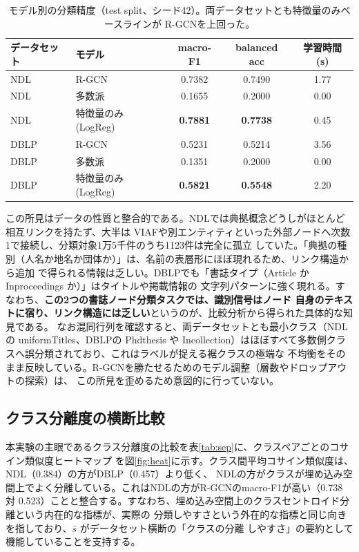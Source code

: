 \documentclass[dvipdfmx,twoside,11pt]{article}
\begin{document}
\begin{table}[t]
\centering
\caption{モデル別の分類精度（test split、シード42）。両データセットとも特徴量のみベースラインが
R-GCNを上回った。}
\label{tab:acc}
\begin{tabular}{llccc}
\toprule
データセット & モデル & macro-F1 & balanced acc & 学習時間 (s) \\
\midrule
NDL  & R-GCN                    & 0.7382 & 0.7490 & 1.77 \\
NDL  & 多数派                   & 0.1655 & 0.2000 & 0.00 \\
NDL  & 特徴量のみ (LogReg)      & \textbf{0.7881} & \textbf{0.7738} & 0.45 \\
\midrule
DBLP & R-GCN                    & 0.5231 & 0.5214 & 3.56 \\
DBLP & 多数派                   & 0.1351 & 0.2000 & 0.00 \\
DBLP & 特徴量のみ (LogReg)      & \textbf{0.5821} & \textbf{0.5548} & 2.20 \\
\bottomrule
\end{tabular}
\end{table}

この所見はデータの性質と整合的である。NDLでは典拠概念どうしがほとんど相互リンクを持たず、大半は
VIAFや別エンティティといった外部ノードへ次数1で接続し、分類対象1万5千件のうち1123件は完全に孤立
していた。「典拠の種別（人名か地名か団体か）」は、名前の表層形にほぼ現れるため、リンク構造から追加
で得られる情報は乏しい。DBLPでも「書誌タイプ（Article か Inproceedings か）」はタイトルや掲載情報の
文字列パターンに強く現れる。すなわち、\textbf{この2つの書誌ノード分類タスクでは、識別信号はノード
自身のテキストに宿り、リンク構造には乏しい}というのが、比較分析から得られた具体的な知見である。
なお混同行列を確認すると、両データセットとも最小クラス（NDLの uniformTitles、DBLPの Phdthesis や
Incollection）はほぼすべて多数側クラスへ誤分類されており、これはラベルが捉える裾クラスの極端な
不均衡をそのまま反映している。R-GCNを勝たせるためのモデル調整（層数やドロップアウトの探索）は、
この所見を歪めるため意図的に行っていない。

\subsection{クラス分離度の横断比較}

本実験の主眼であるクラス分離度の比較を表\ref{tab:sep}に、クラスペアごとのコサイン類似度ヒートマップ
を図\ref{fig:heat}に示す。クラス間平均コサイン類似度は、NDL（0.384）の方がDBLP（0.457）より低く、
NDLの方がクラスが埋め込み空間上でよく分離している。これはNDLの方がR-GCNのmacro-F1が高い（0.738 対
0.523）ことと整合する。すなわち、埋め込み空間上のクラスセントロイド分離という内在的な指標が、実際の
分類しやすさという外在的な指標と同じ向きを指しており、$\bar{s}$ がデータセット横断の「クラスの分離
しやすさ」の要約として機能していることを支持する。
\end{document}
